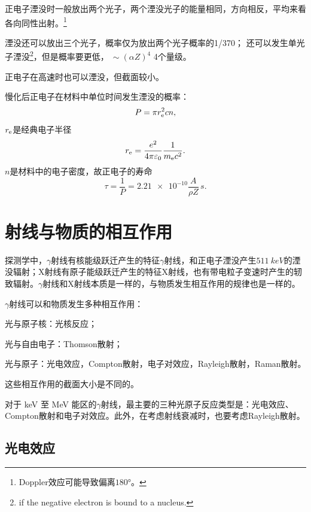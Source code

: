 正电子湮没时一般放出两个光子，两个湮没光子的能量相同，方向相反，平均来看各向同性出射。\footnote{Doppler效应可能导致偏离$\ang{180}$。}

湮没还可以放出三个光子，概率仅为放出两个光子概率的1/370；
还可以发生单光子湮没\footnote{if the negative electron is bound to a nucleus.}，但是概率要更低，$~ \sim (\alpha Z)^4$ 4个量级。

正电子在高速时也可以湮没，但截面较小。

慢化后正电子在材料中单位时间发生湮没的概率：
\begin{equation}\label{eq:nrd-positron-annihilation-rate}
	P = \pi r_{\mathrm{e}}^2cn,
\end{equation}
$r_{\mathrm{e}}$是经典电子半径
\[
	r_{\mathrm{e}} = \frac{e^2}{4\pi\varepsilon_0}\frac1{m_{\mathrm{e}} c^2}.
\]
$n$是材料中的电子密度，故正电子的寿命
\[
	\tau = \frac1P = \num{2.21e-10}\frac{A}{\rho Z}\,\unit{s}.
\]

\section{\gammaray 射线与物质的相互作用}

探测学中，$\gamma$射线有核能级跃迁产生的特征$\gamma$射线，和正电子湮没产生$\qty{511}{keV}$的湮没辐射；X射线有原子能级跃迁产生的特征X射线，也有带电粒子变速时产生的轫致辐射。$\gamma$射线和X射线本质是一样的，与物质发生相互作用的规律也是一样的。

$\gamma$射线可以和物质发生多种相互作用：
\begin{compactitem}
	\item 光与原子核：光核反应；
	\item 光与自由电子：Thomson散射；
	\item 光与原子：光电效应，Compton散射，电子对效应，Rayleigh散射，Raman散射。
\end{compactitem}
这些相互作用的截面大小是不同的。

对于 \unit{keV} 至 \unit{MeV} 能区的$\gamma$射线，最主要的三种光原子反应类型是：光电效应、Compton散射和电子对效应。此外，在考虑射线衰减时，也要考虑Rayleigh散射。

\subsection{光电效应}

